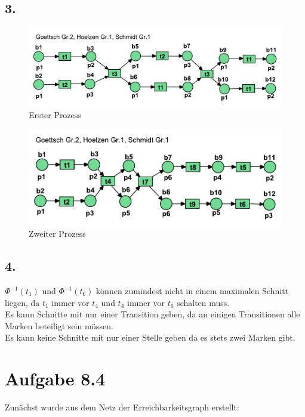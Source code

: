 \documentclass[12pt, paper=a4]{article}
\begin{document}
\subsection*{3.}
\begin{figure}[h!]
	\includegraphics*[scale = 0.7]{Erster_Prozess_8_3.pdf}
	\caption{Erster Prozess}
\end{figure} 
\begin{figure}[h!]
	\includegraphics*[scale = 0.7]{Zweiter_Prozess_8_3.pdf}
	\caption{Zweiter Prozess}
\end{figure} 

\subsection*{4.}
$\Phi^{-1}(t_{1})$ und $\Phi^{-1}(t_{6})$ können zumindest nicht in einem maximalen Schnitt liegen, da $t_{1}$ immer vor $t_{4}$ und $t_{4}$ immer vor $t_{6}$ schalten muss.\\

Es kann Schnitte mit nur einer Transition geben, da an einigen Transitionen alle Marken beteiligt sein müssen.\\

Es kann keine Schnitte mit nur einer Stelle geben da es stets zwei Marken gibt.

\section*{Aufgabe 8.4}

Zunächst wurde aus dem Netz der Erreichbarkeitsgraph erstellt:
\end{document}
